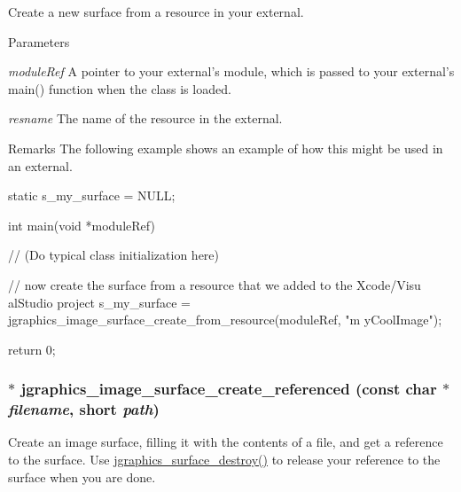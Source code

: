 Create a new surface from a resource in your external. 
\begin{DoxyParams}{Parameters}
\item[{\em moduleRef}]A pointer to your external's module, which is passed to your external's main() function when the class is loaded. \item[{\em resname}]The name of the resource in the external. \end{DoxyParams}
\begin{DoxyRemark}{Remarks}
The following example shows an example of how this might be used in an external. 
\begin{DoxyCode}
    static s_my_surface = NULL;
    
    int main(void *moduleRef)
    {
        // (Do typical class initialization here)
        
        // now create the surface from a resource that we added to the Xcode/Visu
      alStudio project
        s_my_surface = jgraphics_image_surface_create_from_resource(moduleRef, "m
      yCoolImage");

        return 0;
    }
\end{DoxyCode}
 
\end{DoxyRemark}
\hypertarget{group__jsurface_ga0aadea6674e22465d5d81148c8675d61}{
\subsubsection[{jgraphics\_\-image\_\-surface\_\-create\_\-referenced}]{$\ast$ jgraphics\_\-image\_\-surface\_\-create\_\-referenced (const char $\ast$ {\em filename}, \/  short {\em path})}}
\label{group__jsurface_ga0aadea6674e22465d5d81148c8675d61}


Create an image surface, filling it with the contents of a file, and get a reference to the surface. Use \hyperlink{group__jsurface_ga0fb843ca88d59c3a1c933b18cca41524}{jgraphics\_\-surface\_\-destroy()} to release your reference to the surface when you are done.


